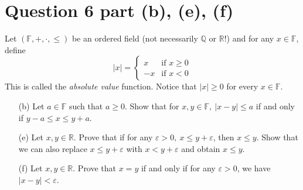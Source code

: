 \message{ !name(Problem_Set_2.tex)}\documentclass[13pt]{article}
\begin{document}
\section*{Question 6 part (b), (e), (f)}
Let $(\mathbb{F}, +, \cdot, \leq)$ be an ordered field (not necessarily $\mathbb{Q}$ or
$\mathbb{R}$!) and for any $x \in \mathbb{F}$, define
\begin{equation}
  |x| =
  \begin{cases}
    x & \text{if } x \geq 0 \\
    -x & \text{if } x < 0
  \end{cases}
\end{equation}
This is called the \textit{absolute value} function. Notice that $|x| \geq 0$ for every $x \in
\mathbb{F}$.
\begin{enumerate}[label=(\alph*)]
\item [(b)] Let $a \in \mathbb{F}$ such that $a \geq 0$. Show that for $x, y \in \mathbb{F}, \
  |x - y| \leq a$ if and only if $y - a \leq x \leq y + a$.
\item [(e)] Let $x, y \in \mathbb{R}$. Prove that if for any $\varepsilon > 0, \ x \leq y + \varepsilon$,
  then $x \leq y$. Show that we can also replace $x \leq y + \varepsilon$ with $x < y + \varepsilon$ and
  obtain $x \leq y$.
\item [(f)] Let $x, y \in \mathbb{R}$. Prove that $x = y$ if and only if for any $\varepsilon > 0$,
  we have $|x - y| < \varepsilon$.
\end{enumerate}
\end{document}

